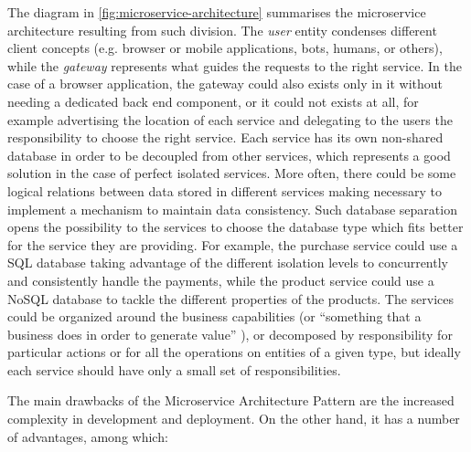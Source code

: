 The diagram in \autoref{fig:microservice-architecture} summarises the
microservice architecture resulting from such division. The \emph{user} entity
condenses different client concepts (e.g. browser or mobile applications, bots,
humans, or others), while the \emph{gateway} represents what guides the requests
to the right service. In the case of a browser application, the gateway could
also exists only in it without needing a dedicated back end component, or it
could not exists at all, for example advertising the location of each service
and delegating to the users the responsibility to choose the right service. Each
service has its own non-shared database in order to be decoupled from other
services, which represents a good solution in the case of perfect isolated
services. More often, there could be some logical relations between data stored
in different services making necessary to implement a mechanism to maintain data
consistency. Such database separation opens the possibility to the services to
choose the database type which fits better for the service they are providing.
For example, the purchase service could use a SQL database taking advantage of
the different isolation levels to concurrently and consistently handle the
payments, while the product service could use a NoSQL database to tackle the
different properties of the products. The services could be organized around the
business capabilities (or ``something that a business does in order to generate
value'' \cite{bib:decompose-business-capability}), or decomposed by
responsibility for particular actions or for all the operations on entities of a
given type, but ideally each service should have only a small set of
responsibilities.

The main drawbacks of the Microservice Architecture Pattern
\cite{bib:microservice-architecture} are the increased complexity in development
and deployment. On the other hand, it has a number of advantages, among which:

